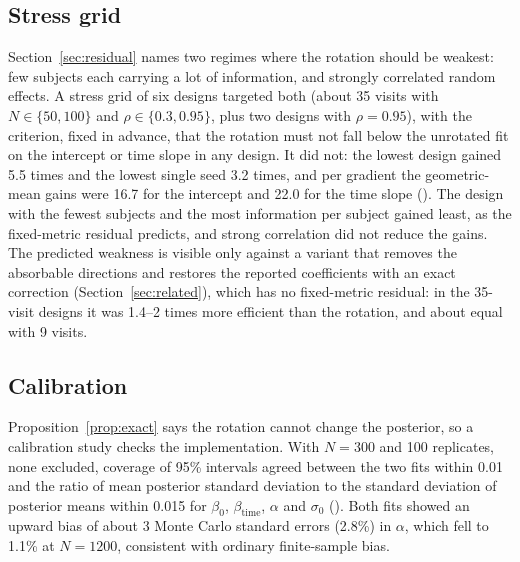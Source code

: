 \subsection{Stress grid}\label{sec:stress}

Section~\ref{sec:residual} names two regimes where the rotation should be
weakest: few subjects each carrying a lot of information, and strongly
correlated random effects. A stress grid of six designs targeted both
(about 35 visits with $N \in \{50, 100\}$ and $\rho \in \{0.3, 0.95\}$,
plus two designs with $\rho = 0.95$), with the criterion, fixed in
advance, that the rotation must not fall below the unrotated fit on the
intercept or time slope in any design. It did not: the lowest design gained
5.5 times and the lowest single seed 3.2 times, and per gradient the
geometric-mean gains were 16.7 for the intercept and 22.0 for the time
slope (). The design with the fewest subjects and
the most information per subject gained least, as the fixed-metric
residual predicts, and strong correlation did not reduce the gains. The
predicted weakness is visible only against a variant that removes the
absorbable directions and restores the reported coefficients with an
exact correction (Section~\ref{sec:related}), which has no fixed-metric
residual: in the 35-visit designs it was 1.4--2 times more efficient than
the rotation, and about equal with 9 visits.

\subsection{Calibration}\label{sec:calibration}

Proposition~\ref{prop:exact} says the rotation cannot change the
posterior, so a calibration study checks the implementation. With $N =
300$ and 100 replicates, none excluded, coverage of 95\% intervals agreed
between the two fits within 0.01 and the ratio of mean posterior standard
deviation to the standard deviation of posterior means within 0.015 for
$\beta_0$, $\beta_{\mathrm{time}}$, $\alpha$ and $\sigma_0$
(). Both fits showed an upward bias of about 3 Monte
Carlo standard errors (2.8\%) in $\alpha$, which fell to 1.1\% at $N =
1200$, consistent with ordinary finite-sample bias.
